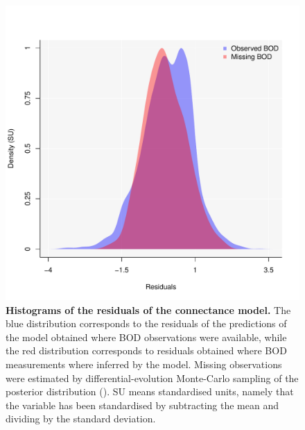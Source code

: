 \documentclass[11pt, oneside]{article}
\begin{document}
\begin{figure}[H]
\begin{center}
\includegraphics[page=1, width=1\linewidth]{scripts/b0_6_3/out_con/fig_hist_residuals.pdf}
\caption{
    \textbf{Histograms of the residuals of the connectance model.}
    The blue distribution corresponds to the residuals of the predictions of the model obtained where BOD observations were available, while the red distribution corresponds to residuals obtained where BOD measurements where inferred by the model.
    Missing observations were estimated by differential-evolution Monte-Carlo sampling of the posterior distribution (\cite{TerBraak2006}).
    SU means standardised units, namely that the variable has been standardised by subtracting the mean and dividing by the standard deviation.
} 
\end{center}
\end{figure}
\end{document}
